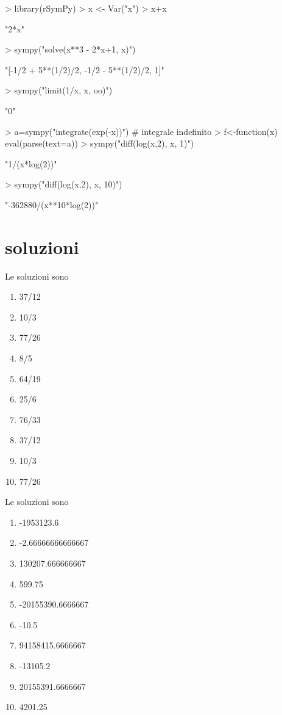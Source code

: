 \documentclass[onecolumn,11pt]{book}
\begin{document}
\begin{Schunk}
\begin{Sinput}
> library(rSymPy)  
> x <- Var("x")
> x+x
\end{Sinput}
\begin{Soutput}
[1] "2*x"
\end{Soutput}
\begin{Sinput}
> sympy("solve(x**3 - 2*x+1, x)") 
\end{Sinput}
\begin{Soutput}
[1] "[-1/2 + 5**(1/2)/2, -1/2 - 5**(1/2)/2, 1]"
\end{Soutput}
\begin{Sinput}
> sympy("limit(1/x, x, oo)")
\end{Sinput}
\begin{Soutput}
[1] "0"
\end{Soutput}
\begin{Sinput}
> a=sympy("integrate(exp(-x))") # integrale indefinito
>  f<-function(x)  eval(parse(text=a))
> sympy("diff(log(x,2), x, 1)")
\end{Sinput}
\begin{Soutput}
[1] "1/(x*log(2))"
\end{Soutput}
\begin{Sinput}
> sympy("diff(log(x,2), x, 10)")
\end{Sinput}
\begin{Soutput}
[1] "-362880/(x**10*log(2))"
\end{Soutput}
\end{Schunk}
\section{soluzioni}

Le soluzioni sono
\begin{enumerate}

\item  37/12
\item  10/3
\item  77/26
\item  8/5
\item  64/19
\item  25/6
\item  76/33
\item  37/12
\item  10/3
\item  77/26
\end{enumerate}
 

Le soluzioni sono
\begin{enumerate}
 \item 
-1953123.6 \item 
-2.66666666666667 \item 
130207.666666667 \item 
599.75 \item 
-20155390.6666667 \item 
-10.5 \item 
94158415.6666667 \item 
-13105.2 \item 
20155391.6666667 \item 
4201.25
\end{enumerate}
\end{document}
